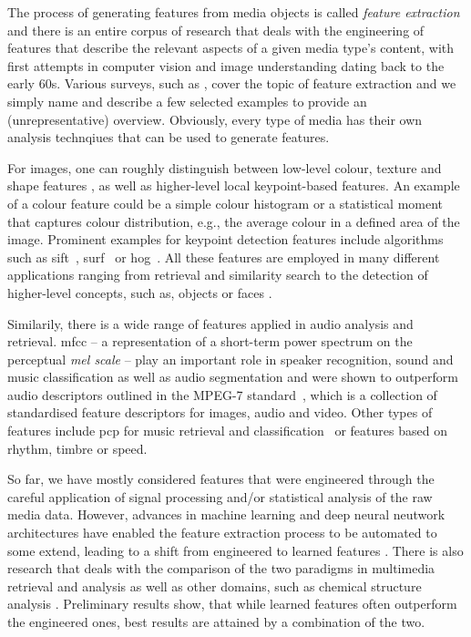 The process of generating features from media objects is called \emph{feature extraction} \cite{Blanken:2007multimedia} and there is an entire corpus of research that deals with the engineering of features that describe the relevant aspects of a given media type's content, with first attempts in computer vision and image understanding dating back to the early 60s. Various surveys, such as \cite{McKinney:2003Features,Ding:2012ASurvey,Salau:2019Feature}, cover the topic of feature extraction and we simply name and describe a few selected examples to provide an (unrepresentative) overview. Obviously, every type of media has their own analysis technqiues that can be used to generate features.

For images, one can roughly distinguish between low-level colour, texture and shape features \cite{Salau:2019Feature}, as well as higher-level local keypoint-based features. An example of a colour feature could be a simple colour histogram or a statistical moment that captures colour distribution, e.g., the average colour in a defined area of the image. Prominent examples for keypoint detection features include algorithms such as \acrfull{sift}~\cite{Lowe:1999object}, \acrfull{surf}~\cite{Bay:2006surf} or \acrfull{hog}~\cite{Dalal:2005Histograms}. All these features are employed in many different applications ranging from retrieval and similarity search to the detection of higher-level concepts, such as, objects or faces \cite{Deniz:2011Face, Farooq:2016Object}.

Similarily, there is a wide range of features applied in audio analysis and retrieval. \acrfull{mfcc} -- a representation of a short-term power spectrum on the perceptual \emph{mel scale} -- play an important role in speaker recognition, sound and music classification as well as audio segmentation \cite{Kim:2010Comparison} and were shown to outperform audio descriptors outlined in the MPEG-7 standard~\cite{Quackenbush:2001Overview}, which is a collection of standardised feature descriptors for images, audio and video. Other types of features include \acrfull{pcp} for music retrieval and classification~\cite{Lee:2006Automatic,Demirel:2019Automatic} or features based on rhythm, timbre or speed. 

So far, we have mostly considered features that were engineered through the careful application of signal processing and/or statistical analysis of the raw media data. However, advances in machine learning and deep neural neutwork architectures have enabled the feature extraction process to be automated to some extend, leading to a shift from  engineered to learned features \cite{Hamel:2010Learning,Gordo:2016Deep}. There is also research that deals with the comparison of the two paradigms in multimedia retrieval and analysis \cite{Budnik:2017learned} as well as other domains, such as chemical structure analysis \cite{Gallegos:2021importance}. Preliminary results show, that while learned features often outperform the engineered ones, best results are attained by a combination of the two.

